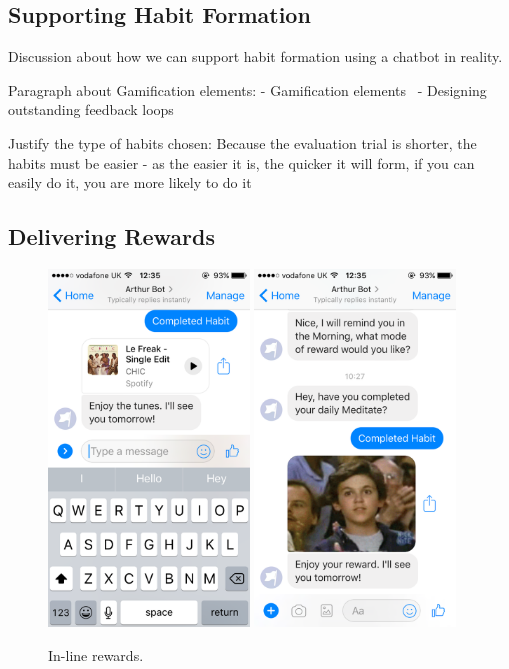 \subsection{Supporting Habit Formation}

Discussion about how we can support habit formation using a chatbot in reality.

Paragraph about Gamification elements:
- Gamification elements~\cite{article_free_to_play_making_money_from_games_you_give_away}
- Designing outstanding feedback loops~\cite{website_how_to_design_feedback_loops}

Justify the type of habits chosen: Because the evaluation trial is shorter, the habits must be easier - as the easier it is, the quicker it will form, if you can easily do it, you are more likely to do it



\subsection{Delivering Rewards}

\begin{figure}[H]
  \centering
  \includegraphics[width=2.1in]{../resources/design/reward-audio-inline.png}
  \hspace{10px}
  \includegraphics[width=2.1in]{../resources/design/reward-visual-inline.png}
  \caption{In-line rewards.}
  \label{fig:rewards_inline}
\end{figure}

